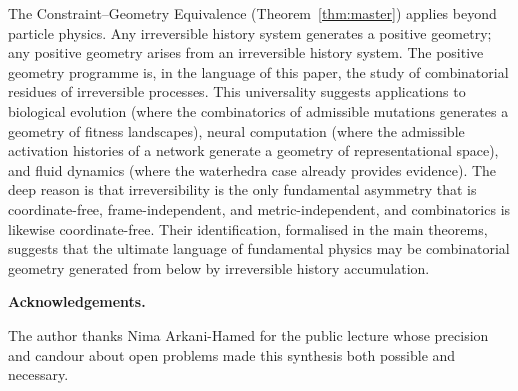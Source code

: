 \documentclass[12pt, oneside]{amsart}
\theoremstyle{plain}
\theoremstyle{definition}
\theoremstyle{remark}
\begin{document}
The Constraint--Geometry Equivalence (Theorem~\ref{thm:master}) applies beyond particle physics. Any irreversible history system generates a positive geometry; any positive geometry arises from an irreversible history system. The positive geometry programme is, in the language of this paper, the study of combinatorial residues of irreversible processes. This universality suggests applications to biological evolution (where the combinatorics of admissible mutations generates a geometry of fitness landscapes), neural computation (where the admissible activation histories of a network generate a geometry of representational space), and fluid dynamics (where the waterhedra case already provides evidence). The deep reason is that irreversibility is the only fundamental asymmetry that is coordinate-free, frame-independent, and metric-independent, and combinatorics is likewise coordinate-free. Their identification, formalised in the main theorems, suggests that the ultimate language of fundamental physics may be combinatorial geometry generated from below by irreversible history accumulation.

\bigskip\noindent\textbf{Acknowledgements.}

The author thanks Nima Arkani-Hamed for the public lecture whose precision and candour about open problems made this synthesis both possible and necessary.



\end{document}

